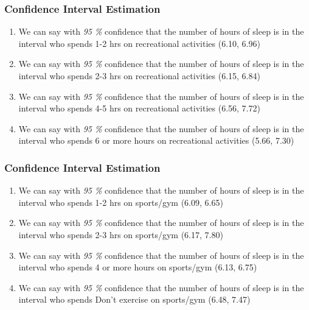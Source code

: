 \documentclass[11pt,]{beamer}
\begin{document}
\begin{frame}
	\frametitle{Confidence Interval Estimation}
	
	\begin{enumerate}
	\item{We can say with \textit{95 \%} confidence that the number of hours of sleep is in the interval who spends 1-2 hrs on recreational activities (6.10, 6.96)}
	
	\bigskip
	
    \item{We can say with \textit{95 \%} confidence that the number of hours of sleep is in the interval who spends 2-3 hrs on recreational activities (6.15, 6.84)}
    
    \bigskip
    
    \item{We can say with \textit{95 \%} confidence that the number of hours of sleep is in the interval who spends 4-5 hrs on recreational activities (6.56, 7.72)}
    
    \bigskip
    
    \item{We can say with \textit{95 \%} confidence that the number of hours of sleep is in the interval who spends 6 or more hours on recreational activities (5.66, 7.30)}
	\end{enumerate}
	
\end{frame}

\begin{frame}
	\frametitle{Confidence Interval Estimation}
	
    \begin{enumerate}\addtocounter{enumi}{4}
    
    \item{We can say with \textit{95 \%} confidence that the number of hours of sleep is in the interval who spends 1-2 hrs on sports/gym (6.09, 6.65)}
    
    \bigskip
    
    \item{We can say with \textit{95 \%} confidence that the number of hours of sleep is in the interval who spends 2-3 hrs on sports/gym (6.17, 7.80)}
    
    \bigskip
    
    \item{We can say with \textit{95 \%} confidence that the number of hours of sleep is in the interval who spends 4 or more hours on sports/gym (6.13, 6.75)}
    
    \bigskip
    
    \item{We can say with \textit{95 \%} confidence that the number of hours of sleep is in the interval who spends Don't exercise on sports/gym (6.48, 7.47)}
    
    \end{enumerate}
    
\end{frame}
\end{document}

